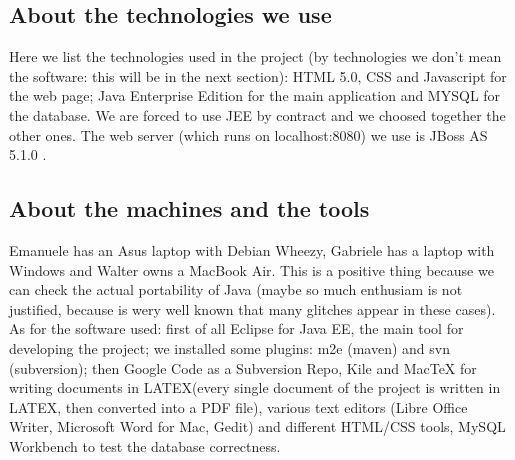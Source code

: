\documentclass[a4paper,12pt]{article}
\begin{document}
\subsection{About the technologies we use}
Here we list the technologies used in the project (by technologies we don’t mean the software: this will be in the next section): HTML 5.0, CSS and Javascript for the web page; Java Enterprise Edition for the main application and MYSQL for the database. We are forced to use JEE by contract and we choosed together the other ones. The web server (which runs on localhost:8080) we use is JBoss AS 5.1.0 .
\subsection{About the machines and the tools}
Emanuele has an Asus laptop with Debian Wheezy, Gabriele has a laptop with Windows and Walter owns a MacBook Air. This is a positive thing because we can check the actual portability of Java (maybe so much enthusiam is not justified, because is wery well known that many glitches appear in these cases).\\[1\baselineskip]As for the software used: first of all Eclipse for Java EE, the main tool for developing the project; we installed some plugins: m2e (maven) and svn (subversion); then Google Code as a Subversion Repo, Kile and MacTeX for writing documents in LATEX(every single document of the project is written in LATEX, then converted into a PDF file), various text editors (Libre Office Writer, Microsoft Word for Mac, Gedit) and different HTML/CSS tools, MySQL Workbench to test the database correctness.
\end{document}
